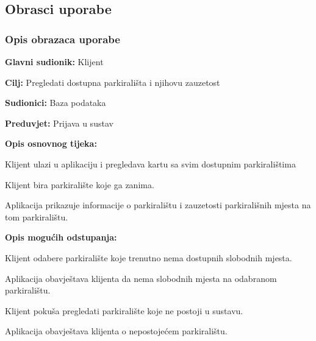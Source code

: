 \subsection{Obrasci uporabe}


\subsubsection{Opis obrazaca uporabe}

\noindent {}
\begin{packed_item}
	
	\item \textbf{Glavni sudionik: }Klijent
	\item  \textbf{Cilj:} Pregledati dostupna parkirališta i njihovu zauzetost
	\item  \textbf{Sudionici:} Baza podataka
	\item  \textbf{Preduvjet:} Prijava u sustav
	\item  \textbf{Opis osnovnog tijeka:}
	
	\item[] \begin{packed_enum}
		
		\item Klijent ulazi u aplikaciju i pregledava kartu sa svim dostupnim parkiralištima
		\item Klijent bira parkiralište koje ga zanima.
		\item Aplikacija prikazuje informacije o parkiralištu i zauzetosti parkirališnih mjesta na tom parkiralištu.
		
	\end{packed_enum}
	
	\item  \textbf{Opis mogućih odstupanja:}
	
	\item[] \begin{packed_item}
		
		\item[2.a] Klijent odabere parkiralište koje trenutno nema dostupnih slobodnih mjesta.
		\item[] \begin{packed_enum}
			
			\item Aplikacija obavještava klijenta da nema slobodnih mjesta na odabranom parkiralištu.
			
		\end{packed_enum}
		\item[2.b] Klijent pokuša pregledati parkiralište koje ne postoji u sustavu.
		\item[] \begin{packed_enum}
			
			\item Aplikacija obavještava klijenta o nepostojećem parkiralištu.
			
		\end{packed_enum}
		
	\end{packed_item}
	
\end{packed_item}

